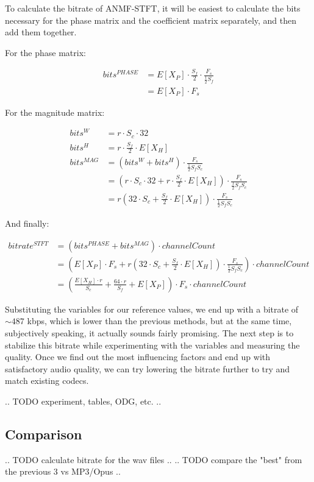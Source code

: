 To calculate the bitrate of ANMF-STFT, it will be easiest to calculate the bits necessary for the phase matrix and the coefficient matrix separately, and then add them together.

For the phase matrix:

\begin{align}
bits^{PHASE}
&= E[X_P] \cdot \frac{S_f}{2} \cdot \frac{F_s}{\frac12 S_f} \\
&= E[X_P] \cdot F_s
\end{align}

For the magnitude matrix:

\begin{align}
bits^W &= r \cdot S_c \cdot 32 \\
bits^H &= r \cdot \frac{S_f}{2} \cdot E[X_H] \\
bits^{MAG} &= (bits^W + bits^H) \cdot \frac{F_s}{\frac12 S_fS_c} \\
&= \left( r \cdot S_c \cdot 32 + r \cdot \frac{S_f}{2} \cdot E[X_H] \right) \cdot \frac{F_s}{\frac12 S_fS_c} \\
&= r(32 \cdot S_c + \frac{S_f}{2} \cdot E[X_H]) \cdot \frac{F_s}{\frac12 S_fS_c}
\end{align}

And finally:

\begin{align}
bitrate^{STFT} &= (bits^{PHASE} + bits^{MAG}) \cdot channelCount \\
&= (E[X_P] \cdot F_s + r(32 \cdot S_c + \frac{S_f}{2} \cdot E[X_H]) \cdot \frac{F_s}{\frac12 S_fS_c}) \cdot channelCount \\
&= \left( \frac{E[X_H] \cdot r}{S_c} + \frac{64 \cdot r}{S_f} + E[X_P] \right) \cdot F_s \cdot channelCount
\end{align}

Substituting the variables for our reference values, we end up with a bitrate of $\sim 487$ kbps, which is lower than the previous methods, but at the same time, subjectively speaking, it actually sounds fairly promising. The next step is to stabilize this bitrate while experimenting with the variables and measuring the quality. Once we find out the most influencing factors and end up with satisfactory audio quality, we can try lowering the bitrate further to try and match existing codecs.

.. TODO experiment, tables, ODG, etc. ..

\subsection{Comparison}
.. TODO calculate bitrate for the wav files ..
.. TODO compare the "best" from the previous 3 vs MP3/Opus ..
